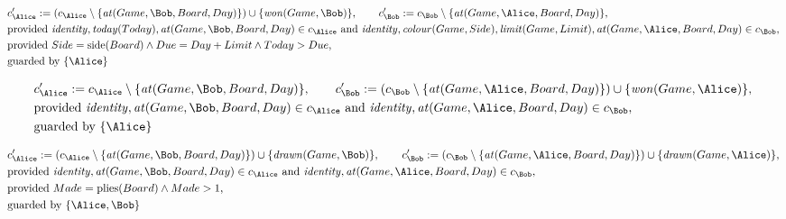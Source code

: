 \begin{align*}
&
c'_
{
\Alice
}
 := 
(c_
{
\Alice
}
 \setminus 
\{
\mathit{\detokenize{
at
}}
(
Game
,
\Bob
,
Board
,
Day
)
\}
) \cup 
\{
\mathit{\detokenize{
won
}}
(
Game
,
\Bob
)
\}
, \qquad 
c'_
{
\Bob
}
 := 
c_
{
\Bob
}
 \setminus 
\{
\mathit{\detokenize{
at
}}
(
Game
,
\Alice
,
Board
,
Day
)
\}
,\\
&
\text{provided } 
\mathit{\detokenize{
identity
}}
,
\mathit{\detokenize{
today
}}
(
Today
)
,
\mathit{\detokenize{
at
}}
(
Game
,
\Bob
,
Board
,
Day
)
 \in c_
{
\Alice
}
 \text{ and } 
\mathit{\detokenize{
identity
}}
,
\mathit{\detokenize{
colour
}}
(
Game
,
Side
)
,
\mathit{\detokenize{
limit
}}
(
Game
,
Limit
)
,
\mathit{\detokenize{
at
}}
(
Game
,
\Alice
,
Board
,
Day
)
 \in c_
{
\Bob
}
,\\
&
\text{provided } 
Side
=
\mathrm{
side
}(
Board
)
\land
Due
=
Day
+
Limit
\land
Today
>
Due
,\\
&
\text{guarded by } \{
\Alice
\}
\end{align*}

\begin{align*}
&
c'_
{
\Alice
}
 := 
c_
{
\Alice
}
 \setminus 
\{
\mathit{\detokenize{
at
}}
(
Game
,
\Bob
,
Board
,
Day
)
\}
, \qquad 
c'_
{
\Bob
}
 := 
(c_
{
\Bob
}
 \setminus 
\{
\mathit{\detokenize{
at
}}
(
Game
,
\Alice
,
Board
,
Day
)
\}
) \cup 
\{
\mathit{\detokenize{
won
}}
(
Game
,
\Alice
)
\}
,\\
&
\text{provided } 
\mathit{\detokenize{
identity
}}
,
\mathit{\detokenize{
at
}}
(
Game
,
\Bob
,
Board
,
Day
)
 \in c_
{
\Alice
}
 \text{ and } 
\mathit{\detokenize{
identity
}}
,
\mathit{\detokenize{
at
}}
(
Game
,
\Alice
,
Board
,
Day
)
 \in c_
{
\Bob
}
,\\
&
\text{guarded by } \{
\Alice
\}
\end{align*}

\begin{align*}
&
c'_
{
\Alice
}
 := 
(c_
{
\Alice
}
 \setminus 
\{
\mathit{\detokenize{
at
}}
(
Game
,
\Bob
,
Board
,
Day
)
\}
) \cup 
\{
\mathit{\detokenize{
drawn
}}
(
Game
,
\Bob
)
\}
, \qquad 
c'_
{
\Bob
}
 := 
(c_
{
\Bob
}
 \setminus 
\{
\mathit{\detokenize{
at
}}
(
Game
,
\Alice
,
Board
,
Day
)
\}
) \cup 
\{
\mathit{\detokenize{
drawn
}}
(
Game
,
\Alice
)
\}
,\\
&
\text{provided } 
\mathit{\detokenize{
identity
}}
,
\mathit{\detokenize{
at
}}
(
Game
,
\Bob
,
Board
,
Day
)
 \in c_
{
\Alice
}
 \text{ and } 
\mathit{\detokenize{
identity
}}
,
\mathit{\detokenize{
at
}}
(
Game
,
\Alice
,
Board
,
Day
)
 \in c_
{
\Bob
}
,\\
&
\text{provided } 
Made
=
\mathrm{
plies
}(
Board
)
\land
Made
>
1
,\\
&
\text{guarded by } \{
\Alice
,
\Bob
\}
\end{align*}
